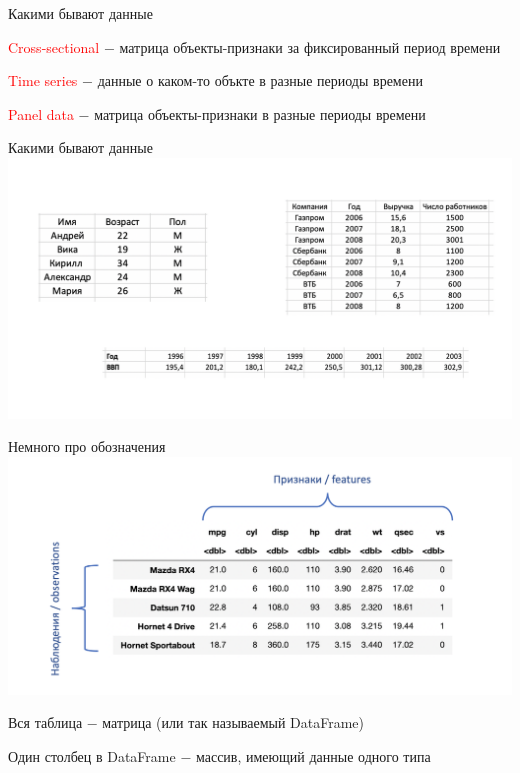 \documentclass[notes,12pt, aspectratio=169]{beamer}
\newenvironment{wideitemize}{\itemize\addtolength{\itemsep}{10pt}}{\enditemize}
\begin{document}
\begin{frame}{Какими бывают данные}
	\begin{wideitemize}
		\item \textcolor{red}{Cross-sectional} $-$ матрица объекты-признаки за фиксированный период времени
		\item \textcolor{red}{Time series} $-$ данные о каком-то объкте в разные периоды времени
		\item \textcolor{red}{Panel data} $-$ матрица объекты-признаки в разные периоды времени
	\end{wideitemize}
\end{frame}

\begin{frame}{Какими бывают данные}
	\centering \includegraphics[scale = 0.45]{ris2.png}
\end{frame}

\begin{frame}{Немного про обозначения}
	\centering \includegraphics[scale = 0.45]{ris3.png}
	\begin{wideitemize}
		\item Вся таблица $-$ матрица (или так называемый DataFrame)
		\item Один столбец в DataFrame $-$ массив, имеющий данные одного типа 
	\end{wideitemize}
\end{frame}
\end{document}
